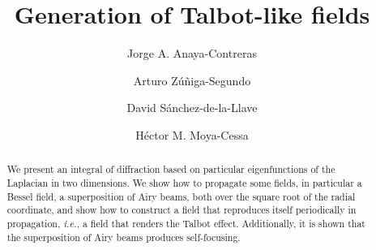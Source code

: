 \documentclass[aps,pra,reprint,superscriptaddress]{revtex4-2}
\begin{document}
\title{Generation of Talbot-like fields}
\author{Jorge A. Anaya-Contreras}
\author{ Arturo Z\'uñiga-Segundo}
\author{David S\'anchez-de-la-Llave} 
\author{ H\'ector M. Moya-Cessa}

\begin{abstract}
We present an integral of diffraction based on particular eigenfunctions of the Laplacian in two dimensions.
We show how to propagate some fields, in particular a Bessel field, a superposition of Airy beams, both over the square root of the radial coordinate, and show how to construct a field that reproduces itself periodically in propagation, {\it i.e.}, a field that renders the Talbot effect. Additionally, it is shown that the superposition of Airy beams produces self-focusing.  
\end{abstract}
\end{document}
